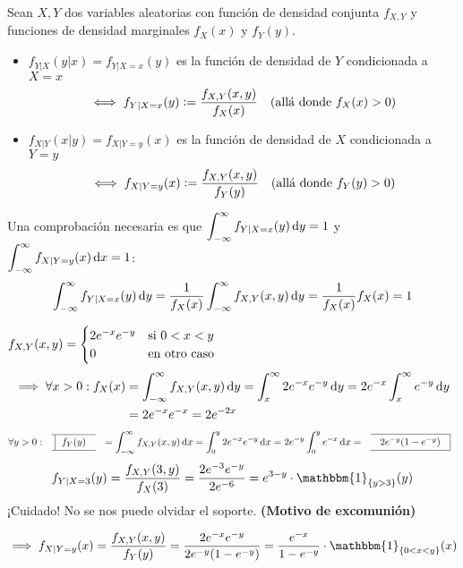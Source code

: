 \begin{defn}
	Sean $X, Y$ dos variables aleatorias con función de densidad conjunta $f_{X, Y}$ y funciones de densidad marginales $f_X(x)$ y $f_Y(y)$.
	\begin{itemize}
		\item $f_{Y|X}(y|x) = f_{Y|X=x}(y)$ es la función de densidad de $Y$ condicionada a $X=x$
		      \[\iff f_{Y|X=x} (y)\vcentcolon= \frac{f_{X, Y}(x, y)}{f_X(x)} \quad (\text{allá donde } f_X(x) > 0)\]
		\item $f_{X|Y}(x|y) = f_{X|Y=y}(x)$ es la función de densidad de $X$ condicionada a $Y=y$
		      \[\iff f_{X|Y=y} (x)\vcentcolon= \frac{f_{X, Y}(x, y)}{f_Y(y)} \quad (\text{allá donde } f_Y(y) > 0)\]
	\end{itemize}
	Una comprobación necesaria es que $\ds \int_{-\infty}^{\infty} f_{Y|X=x} (y) \odif{y} = 1$ y $\ds \int_{-\infty}^{\infty} f_{X|Y=y} (x) \odif{x} = 1$:
	\[\int_{-\infty}^{\infty} f_{Y|X=x} (y) \odif{y} = \frac{1}{f_X(x)} \int_{-\infty}^{\infty} f_{X, Y}(x, y) \odif{y} = \frac{1}{f_X(x)} f_X(x) = 1\]
\end{defn}

\begin{ejem}%
	$\displaystyle f_{X, Y}(x, y) = \begin{cases}
			2e^{-x}e^{-y} & \text{si } 0 < x < y \\
			0             & \text{en otro caso}
		\end{cases}$
	\[\begin{aligned}
			\implies \forall x > 0 :f_X(x) & = \int_{-\infty}^{\infty} f_{X, Y}(x, y) \odif{y} = \int_{x}^{\infty} 2e^{-x}e^{-y} \odif{y} = 2e^{-x} \int_{x}^{\infty} e^{-y} \odif{y} \\
			                               & = 2e^{-x} e^{-x} = 2e^{-2x}
		\end{aligned}\]
	\[\forall y > 0 : \lbox{f_Y(y)} = \int_{-\infty}^{\infty} f_{X, Y}(x, y) \odif{x} = \int_{0}^{y} 2e^{-x}e^{-y} \odif{x} = 2e^{-y} \int_{0}^{y} e^{-x} \odif{x} = \rbox{2e^{-y} (1 - e^{-y})}\]
	\[f_{Y|X=3} (y) = \frac{f_{X, Y}(3, y)}{f_X(3)} = \frac{2e^{-3}e^{-y}}{2e^{-6}} = e^{3-y} \cdot \mathbbm{1}_{\{y>3\}}(y)\]
	¡Cuidado! No se nos puede olvidar el soporte. \hspace{\fill} \textbf{(Motivo de excomunión)}

	\[\implies f_{X|Y=y} (x) = \frac{f_{X, Y}(x, y)}{f_Y(y)} = \frac{2e^{-x}e^{-y}}{2e^{-y}(1-e^{-y})} = \frac{e^{-x}}{1-e^{-y}} \cdot \mathbbm{1}_{\{0<x<y\}}(x)\]
\end{ejem}

